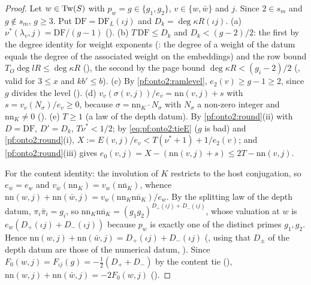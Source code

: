 \begin{proof}
Let $w\in\mathrm{Tw}(S)$ with $p_w=g\in\{g_1,g_2\}$, $v\in\{w,\bar w\}$ and $j$. Since $2\in s_m$ and $g\notin s_m$, $g\ge3$. Put
$\mathrm{DF}=\mathrm{DF}_L(\iota j)$ and $D_k=\deg\kappa R(\iota j)$. (a) $\nu^*(\lambda_v,j)=\mathrm{DF}/(g-1)$
(). (b) $T\,\mathrm{DF}\le D_k$ and $D_k<(g-2)/2$: the first by the degree identity
for weight exponents (: the degree of a weight of the datum equals the degree
of the associated weight on the embeddings) and the row bound $T_O\deg lR\le\deg\kappa R$
(), the second by the page bound $\deg\kappa R<(g_i-2)/2$
(, valid for $3\le x$ and $kb'\le b$). (c) By \cref{pf:onto2:ramlevel}, $e_2(v)\ge g-1\ge2$, since $g$ divides the
level (). (d) $v_v(\sigma(v,j))/e_v=\mathrm{nn}(v,j)+s$ with $s=v_v(N_\sigma)/e_v\ge0$, because
$\sigma=\mathrm{nn}_K\cdot N_\sigma$ with $N_\sigma$ a non-zero integer and $\mathrm{nn}_K\ne0$
(). (e) $T\ge1$ (a law of the depth datum). By \cref{pf:onto2:round}(ii) with
$D=\mathrm{DF}$, $D'=D_k$, $T\nu^*<1/2$; by \eqref{eq:pf:onto2:tieE} ($g$ is bad) and \cref{pf:onto2:round}(i), $X:=E(v,j)/e_v<T(\nu^*+1)+
1/e_2(v)$; and \cref{pf:onto2:round}(iii) gives $e_0(v,j)=X-(\mathrm{nn}(v,j)+s)\le2T-\mathrm{nn}(v,j)$.

For the content identity: the involution of $K$ restricts to the host conjugation, so $e_{\bar w}=e_w$ and
$v_{\bar w}(\mathrm{nn}_K)=v_w(\overline{\mathrm{nn}_K})$, whence $\mathrm{nn}(w,j)+\mathrm{nn}(\bar w,j)=v_w(\mathrm{nn}_K
\overline{\mathrm{nn}_K})/e_w$. By the splitting law of the depth datum, $\pi_i\bar\pi_i=g_i$, so
$\mathrm{nn}_K\overline{\mathrm{nn}_K}=(g_1g_2)^{D_+(\iota j)+D_-(\iota j)}$, whose valuation at $w$ is $e_w(D_+(\iota j)+D_-(\iota j))$
because $p_w$ is exactly one of the distinct primes $g_1,g_2$. Hence $\mathrm{nn}(w,j)+\mathrm{nn}(\bar w,j)=D_+(\iota j)+D_-(\iota j)$
(, using that $D_\pm$ of the depth datum are those of the numerical datum,
). Since $F_0(w,j)=F_{\iota j}(g)=-\tfrac12(D_++D_-)$ by the content tie
(), $\mathrm{nn}(w,j)+\mathrm{nn}(\bar w,j)=-2F_0(w,j)$
().
\end{proof}

